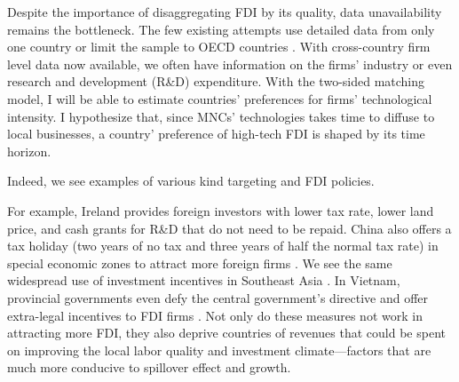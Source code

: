 Despite the importance of disaggregating FDI by its quality, data unavailability
remains the bottleneck. The few existing attempts use detailed data from only
one country or limit the sample to OECD countries \citep{Alfaro2003, Alfaro2007,
Javorcik2004}. With cross-country firm level data now available, we often have
information on the firms' industry or even research and development (R\&D)
expenditure. With the two-sided matching model, I will be able to estimate
countries' preferences for firms' technological intensity. I hypothesize that,
since MNCs' technologies takes time to diffuse to local businesses, a country'
preference of high-tech FDI is shaped by its time horizon.

Indeed, we see examples of various kind targeting and FDI policies.

For example, Ireland provides foreign investors with lower tax rate, lower land price, and cash grants for R\&D that do not need to be repaid. China also offers a tax holiday (two years of no tax and three years of half the normal tax rate) in special economic zones to attract more foreign firms \citep{Telford2001}. We see the same widespread use of investment incentives in Southeast Asia \citep{Fletcher2002}. In Vietnam, provincial governments even defy the central government's directive and offer extra-legal incentives to FDI firms \citep{Vu2007}. Not only do these measures not work in attracting more FDI, they also deprive countries of revenues that could be spent on improving the local labor quality and investment climate---factors that are much more conducive to spillover effect and growth.

